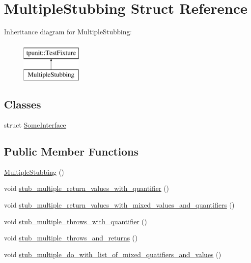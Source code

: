 \hypertarget{structMultipleStubbing}{}\section{Multiple\+Stubbing Struct Reference}
\label{structMultipleStubbing}
Inheritance diagram for Multiple\+Stubbing\+:\begin{figure}[H]
\begin{center}
\leavevmode
\includegraphics[height=2.000000cm]{structMultipleStubbing}
\end{center}
\end{figure}
\subsection*{Classes}
\begin{DoxyCompactItemize}
\item 
struct \mbox{\hyperlink{structMultipleStubbing_1_1SomeInterface}{Some\+Interface}}
\end{DoxyCompactItemize}
\subsection*{Public Member Functions}
\begin{DoxyCompactItemize}
\item 
\mbox{\hyperlink{structMultipleStubbing_ac8e1484cc5c976b4033125cdbdcb49bd}{Multiple\+Stubbing}} ()
\item 
void \mbox{\hyperlink{structMultipleStubbing_a52a5cef81cb437b269fe58a8161aaca1}{stub\+\_\+multiple\+\_\+return\+\_\+values\+\_\+with\+\_\+quantifier}} ()
\item 
void \mbox{\hyperlink{structMultipleStubbing_acb652284166ef3cf9b6d8ee57a4f31b9}{stub\+\_\+multiple\+\_\+return\+\_\+values\+\_\+with\+\_\+mixed\+\_\+values\+\_\+and\+\_\+quantifiers}} ()
\item 
void \mbox{\hyperlink{structMultipleStubbing_ac7cd10a739b9606b9bc8a68502da0853}{stub\+\_\+multiple\+\_\+throws\+\_\+with\+\_\+quantifier}} ()
\item 
void \mbox{\hyperlink{structMultipleStubbing_a802a0acb65b6de95ac966f5cb9664501}{stub\+\_\+multiple\+\_\+throws\+\_\+and\+\_\+returns}} ()
\item 
void \mbox{\hyperlink{structMultipleStubbing_a2fecabd4652aeaac968761b20c96d861}{stub\+\_\+multiple\+\_\+do\+\_\+with\+\_\+list\+\_\+of\+\_\+mixed\+\_\+quatifiers\+\_\+and\+\_\+values}} ()
\end{DoxyCompactItemize}
